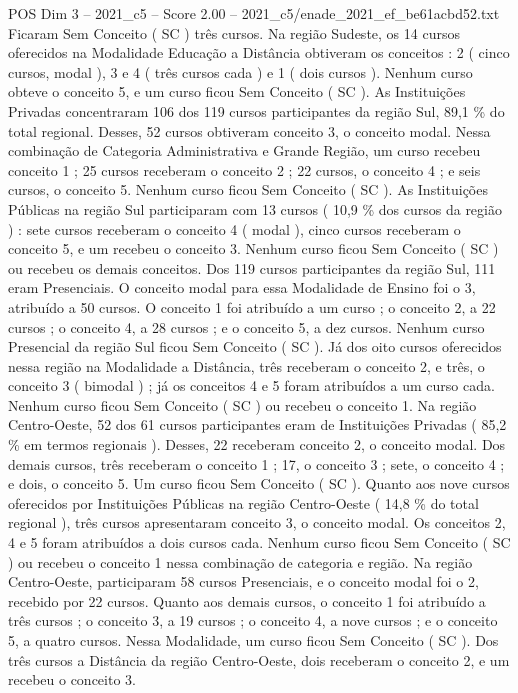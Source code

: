 \begin{textsample}{POS Dim 3 – 2021\_c5 – Score 2.00 – 2021\_c5/enade\_2021\_ef\_be61acbd52.txt}
Ficaram Sem Conceito ( SC ) três cursos.
Na região Sudeste, os 14 cursos oferecidos na Modalidade Educação a Distância obtiveram os conceitos : 2 ( cinco cursos, modal ), 3 e 4 ( três cursos cada ) e 1 ( dois cursos ).
Nenhum curso obteve o conceito 5, e um curso ficou Sem Conceito ( SC ).
As Instituições Privadas concentraram 106 dos 119 cursos participantes da região Sul, 89,1 \% do total regional.
Desses, 52 cursos obtiveram conceito 3, o conceito modal.
Nessa combinação de Categoria Administrativa e Grande Região, um curso recebeu conceito 1 ; 25 cursos receberam o conceito 2 ; 22 cursos, o conceito 4 ; e seis cursos, o conceito 5.
Nenhum curso ficou Sem Conceito ( SC ).
As Instituições Públicas na região Sul participaram com 13 cursos ( 10,9 \% dos cursos da região ) : sete cursos receberam o conceito 4 ( modal ), cinco cursos receberam o conceito 5, e um recebeu o conceito 3.
Nenhum curso ficou Sem Conceito ( SC ) ou recebeu os demais conceitos.
Dos 119 cursos participantes da região Sul, 111 eram Presenciais.
O conceito modal para essa Modalidade de Ensino foi o 3, atribuído a 50 cursos.
O conceito 1 foi atribuído a um curso ; o conceito 2, a 22 cursos ; o conceito 4, a 28 cursos ; e o conceito 5, a dez cursos.
Nenhum curso Presencial da região Sul ficou Sem Conceito ( SC ).
Já dos oito cursos oferecidos nessa região na Modalidade a Distância, três receberam o conceito 2, e três, o conceito 3 ( bimodal ) ; já os conceitos 4 e 5 foram atribuídos a um curso cada.
Nenhum curso ficou Sem Conceito ( SC ) ou recebeu o conceito 1.
Na região Centro-Oeste, 52 dos 61 cursos participantes eram de Instituições Privadas ( 85,2 \% em termos regionais ).
Desses, 22 receberam conceito 2, o conceito modal.
Dos demais cursos, três receberam o conceito 1 ; 17, o conceito 3 ; sete, o conceito 4 ; e dois, o conceito 5.
Um curso ficou Sem Conceito ( SC ).
Quanto aos nove cursos oferecidos por Instituições Públicas na região Centro-Oeste ( 14,8 \% do total regional ), três cursos apresentaram conceito 3, o conceito modal.
Os conceitos 2, 4 e 5 foram atribuídos a dois cursos cada.
Nenhum curso ficou Sem Conceito ( SC ) ou recebeu o conceito 1 nessa combinação de categoria e região.
Na região Centro-Oeste, participaram 58 cursos Presenciais, e o conceito modal foi o 2, recebido por 22 cursos.
Quanto aos demais cursos, o conceito 1 foi atribuído a três cursos ; o conceito 3, a 19 cursos ; o conceito 4, a nove cursos ; e o conceito 5, a quatro cursos.
Nessa Modalidade, um curso ficou Sem Conceito ( SC ).
Dos três cursos a Distância da região Centro-Oeste, dois receberam o conceito 2, e um recebeu o conceito 3.

\end{textsample}
